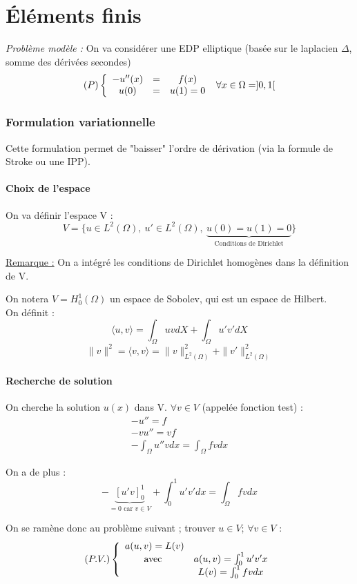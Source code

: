 \part{\'El\'ements finis}
\textit{Problème modèle :} On va considérer une EDP elliptique (basée sur le laplacien $\Delta$, somme des dérivées secondes)
\[(P)\left\{\begin{array}{c c c}
-u''(x) &=& f(x) \\
u(0)&=&u(1)=0
\end{array}\right.\ \forall x\in\Omega=]0,1[  \]

\section{Formulation variationnelle}
Cette formulation permet de "baisser" l'ordre de dérivation (via la formule de Stroke ou une IPP).
\subsection{Choix de l'espace}
On va définir l'espace V :
\[V=\{u\in L^2(\Omega),\ u'\in L^2(\Omega),\ \underbrace{u(0)=u(1)=0}_{\text{Conditions de Dirichlet}}\}\]

\underline{Remarque :} On a intégré les conditions de Dirichlet homogènes dans la définition de V.

\bigskip
On notera $V=H_0^1(\Omega)$ un espace de Sobolev, qui est un espace de Hilbert.\\
On définit :
\[\langle u,v\rangle=\int_{\Omega}uv dX + \int_{\Omega} u'v'dX\]
\[\|v\|^2=\langle v,v\rangle = \|v\|^2_{L^2(\Omega)} + \|v'\|^2_{L^2(\Omega)}\]

\subsection{Recherche de solution}
On cherche la solution $u(x)$ dans V. $\forall v\in V$ (appelée fonction test) :
\begin{eqnarray*}
	-u''=f \\
	-vu''=vf \\
	-\int_{\Omega} u''v dx = \int_{\Omega} fv dx
\end{eqnarray*}

On a de plus :
\[-\underbrace{[u'v]_0^1}_{=0 \text{ car } v\in V} + \int_0^1 u'v' dx = \int_{\Omega} fv dx\]

On se ramène donc au problème suivant ; trouver $u\in V$; $\forall v\in V$ :
\[(P.V.) \left\{ \begin{array}{c c}
a(u,v)=L(v)\\
\text{avec } & a(u,v)=\int_0^1 u'v' x \\
	     & 	L(v)=\int_0^1 fv dx
\end{array}\right.\]

